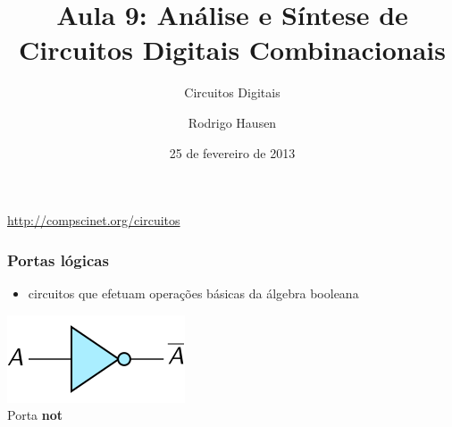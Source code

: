 \documentclass{beamer}
\title{Aula 9: Análise e Síntese de Circuitos Digitais Combinacionais}
\subtitle{Circuitos Digitais}
\author{Rodrigo Hausen}
\institute{CMCC -- UFABC}
\date{25 de fevereiro de 2013}
\begin{document}
\begin{frame}
\maketitle

\vspace{-1cm}

\begin{center}
\url{http://compscinet.org/circuitos}
\end{center}

\end{frame}


\begin{frame}
\frametitle{Portas lógicas}

\begin{itemize}
\item circuitos que efetuam operações básicas da álgebra booleana
\end{itemize}

\hspace*{4ex}
\begin{minipage}{0.4\textwidth}
\begin{center}
\includegraphics{images/not_gate}\\
Porta \textbf{not}
\vspace*{12pt}
\end{center}
\end{minipage}



\end{frame}
\end{document}
